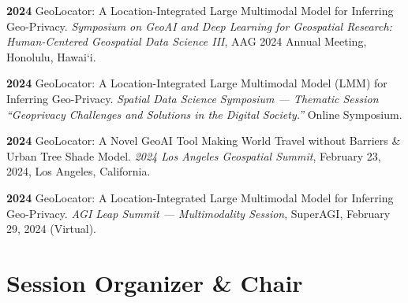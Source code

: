 \documentclass[10pt,letterpaper]{article}
\newenvironment{reflist}
  {\begin{list}{}{%
     \setlength{\leftmargin}{1.7em}\setlength{\itemindent}{-1.7em}%
     \setlength{\itemsep}{0.22em}\setlength{\parsep}{0pt}\setlength{\topsep}{0.25em}}}
  {\end{list}}
\newcommand{\dt}[1]{\textbf{#1}\hspace{0.6em}}
\begin{document}
\begin{reflist}
  \item[] [10] \dt{2024} GeoLocator: A Location-Integrated Large Multimodal Model for Inferring Geo-Privacy. \textit{Symposium on GeoAI and Deep Learning for Geospatial Research: Human-Centered Geospatial Data Science III}, AAG 2024 Annual Meeting, Honolulu, Hawai\textquoteleft i.
  \item[] [11] \dt{2024} GeoLocator: A Location-Integrated Large Multimodal Model (LMM) for Inferring Geo-Privacy. \textit{Spatial Data Science Symposium --- Thematic Session ``Geoprivacy Challenges and Solutions in the Digital Society.''} Online Symposium.
  \item[] [12] \dt{2024} GeoLocator: A Novel GeoAI Tool Making World Travel without Barriers \& Urban Tree Shade Model. \textit{2024 Los Angeles Geospatial Summit}, February 23, 2024, Los Angeles, California.
  \item[] [13] \dt{2024} GeoLocator: A Location-Integrated Large Multimodal Model for Inferring Geo-Privacy. \textit{AGI Leap Summit --- Multimodality Session}, SuperAGI, February 29, 2024 (Virtual).
\end{reflist}

\section{Session Organizer \& Chair}
\end{document}
